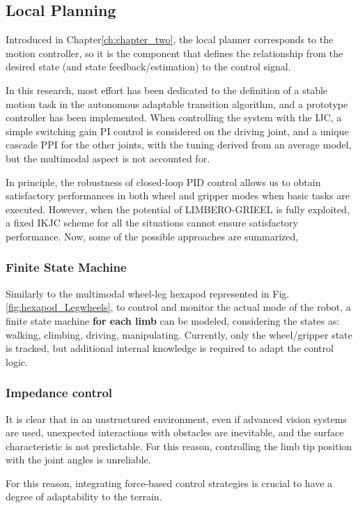 \subsection{Local Planning}
\label{sec:Control}
Introduced in Chapter\ref{ch:chapter_two}, the local planner corresponds to the motion controller, so it is the component that defines the relationship from the desired state (and state feedback/estimation) to the control signal. 

In this research, most effort has been dedicated to the definition of a stable motion task in the autonomous adaptable transition algorithm, and a prototype controller has been implemented. When controlling the system with the IJC, a simple switching gain PI control is considered on the driving joint, and a unique cascade PPI for the other joints, with the tuning derived from an average model, but the multimodal aspect is not accounted for. 

In principle, the robustness of closed-loop PID control allows us to obtain satisfactory performances in both wheel and gripper modes when basic tasks are executed. 
However, when the potential of LIMBERO-GRIEEL is fully exploited, a fixed IKJC scheme for all the situations cannot ensure satisfactory performance. 
Now, some of the possible approaches are summarized, 

\subsubsection{Finite State Machine}
Similarly to the multimodal wheel-leg hexapod \cite{Hexapod_LegWheeled} represented in Fig.\ref{fig:hexapod_Legwheels}, to control and monitor the actual mode of
the robot, a finite state machine \textbf{for each limb} can be modeled, considering the states as: walking, climbing, driving, manipulating. Currently, only the wheel/gripper state is tracked, but additional internal knowledge is required to adapt the control logic. 

\subsubsection{Impedance control}
It is clear that in an unstructured environment, even if advanced vision systems are used, unexpected interactions with obstacles are inevitable, and the surface characteristic is not predictable. 
For this reason, controlling the limb tip position with the joint angles is unreliable. 

For this reason, integrating force-based control strategies is crucial to have a degree of adaptability to the terrain. 

